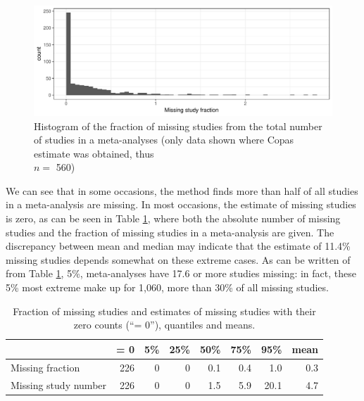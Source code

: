 \documentclass[11pt,a4paper,twoside]{book}\usepackage[]{graphicx}\usepackage[]{color}
\newenvironment{knitrout}{}{} %
\begin{document}
\begin{figure}
\begin{knitrout}
\color{fgcolor}

{\centering \includegraphics[width=\textwidth-3cm]{figure/ch03_figunnamed-chunk-27-1} 

}



\end{knitrout}
\caption{Histogram of the fraction of missing studies from the total number of studies in a meta-analyses (only data shown where Copas estimate was obtained, thus \\$n =$ 560)}
\label{fig:copas.missing}
\end{figure}

We can see that in some occasions, the method finds more than half of all studies in a meta-analysis are missing. In most occasions, the estimate of missing studies is zero, as can be seen in Table \ref{copas.missing}, where both the absolute number of missing studies and the fraction of missing studies in a meta-analysis are given. The discrepancy between mean and median may indicate that the estimate of 11.4\% missing studies depends somewhat on these extreme cases. As can be written of from Table \ref{copas.missing}, 5\%,  meta-analyses have 17.6 or more studies missing: in fact, these 5\% most extreme make up for 1,060, more than 30\% of all missing studies.

\begin{table}[ht]
\centering
\begingroup\footnotesize
\begin{tabular}{lrrrrrrr}
  \hline
 & = 0 & 5\% & 25\% & 50\% & 75\% & 95\% & mean \\ 
  \hline
Missing fraction & 226 & 0 & 0 & 0.1 & 0.4 & 1.0 & 0.3 \\ 
  Missing study number & 226 & 0 & 0 & 1.5 & 5.9 & 20.1 & 4.7 \\ 
   \hline
\end{tabular}
\endgroup
\caption{Fraction of missing studies and estimates of missing studies with their zero counts (``= 0''), quantiles and means.} 
\label{copas.missing}
\end{table}
\end{document}
